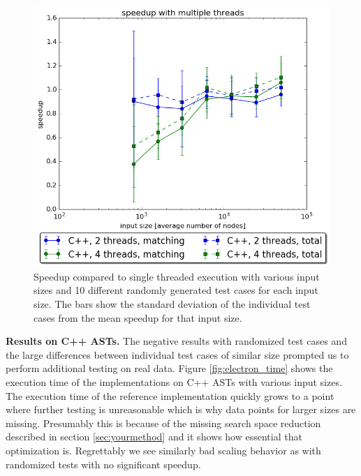 \documentclass[letterpaper]{article}
\newcommand{\mypar}[1]{{\bf #1.}}
\begin{document}
\begin{figure}
	\includegraphics[width=\linewidth]{measurements/random/speedupPlot_c}
	\caption{Speedup compared to single threaded execution with various input sizes and 10 different randomly generated test cases for each input size. The bars show the standard deviation of the individual test cases from the mean speedup for that input size.}
	\label{fig:cpp_speedup}
\end{figure}

\mypar{Results on C++ ASTs}
The negative results with randomized test cases and the large differences between individual test cases of similar size prompted us to perform additional testing on real data.
Figure \ref{fig:electron_time} shows the execution time of the implementations on C++ ASTs with various input sizes.
The execution time of the reference implementation quickly grows to a point where further testing is unreasonable which is why data points for larger sizes are missing.
Presumably this is because of the missing search space reduction described in section \ref{sec:yourmethod} and it shows how essential that optimization is.
Regrettably we see similarly bad scaling behavior as with randomized tests with no significant speedup.
\end{document}

